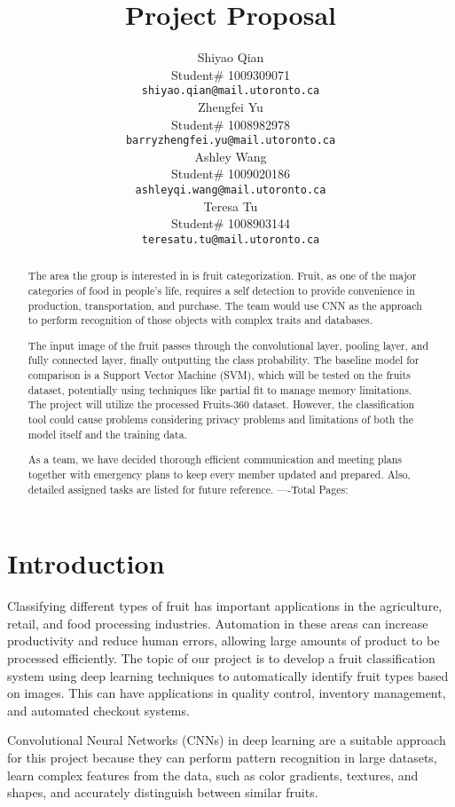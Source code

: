 \documentclass{article} %
\title{Project Proposal}
\author{Shiyao Qian  \\
Student\# 1009309071\\
\texttt{shiyao.qian@mail.utoronto.ca} \\
\And
Zhengfei Yu  \\
Student\# 1008982978 \\
\texttt{barryzhengfei.yu@mail.utoronto.ca} \\
\And
Ashley Wang  \\
Student\# 1009020186 \\
\texttt{ashleyqi.wang@mail.utoronto.ca} \\
\And
Teresa Tu \\
Student\# 1008903144 \\
\texttt{teresatu.tu@mail.utoronto.ca} \\
\AND
}
\begin{document}
\maketitle

\begin{abstract}
The area the group is interested in is fruit categorization. Fruit, as one of the major categories of food in people’s life, requires a self detection to provide convenience in production, transportation, and purchase. The team would use CNN as the approach to perform recognition of those objects with complex traits and databases. 

The input image of the fruit passes through the convolutional layer, pooling layer, and fully connected layer, finally outputting the class probability. The baseline model for comparison is a Support Vector Machine (SVM), which will be tested on the fruits dataset, potentially using techniques like partial fit to manage memory limitations. The project will utilize the processed Fruits-360 dataset. However, the classification tool could cause problems considering privacy problems and limitations of both the model itself and the training data.

As a team, we have decided thorough efficient communication and meeting plans together with emergency plans to keep every member updated and prepared. Also, detailed assigned tasks are listed for future reference.
----Total Pages: \pageref{last_page}
\end{abstract}
\section{Introduction}
Classifying different types of fruit has important applications in the agriculture, retail, and food processing industries. Automation in these areas can increase productivity and reduce human errors, allowing large amounts of product to be processed efficiently. The topic of our project is to develop a fruit classification system using deep learning techniques to automatically identify fruit types based on images. This can have applications in quality control, inventory management, and automated checkout systems.

Convolutional Neural Networks (CNNs) in deep learning are a suitable approach for this project because they can perform pattern recognition in large datasets, learn complex features from the data, such as color gradients, textures, and shapes, and accurately distinguish between similar fruits.
\end{document}
